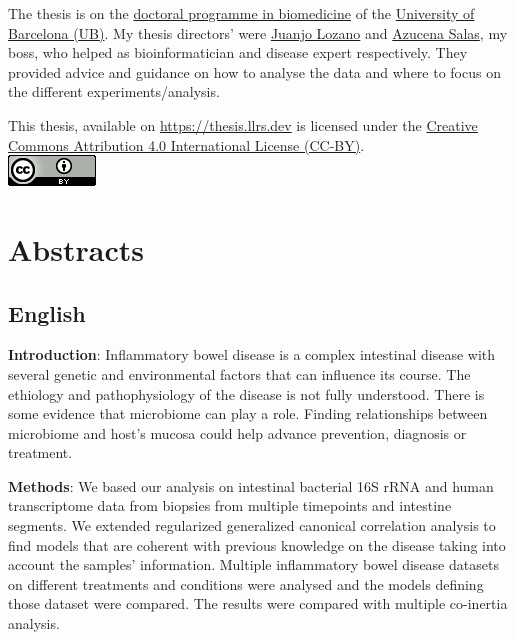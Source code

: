 \documentclass[
  12pt,
  a4paper,
  twoside,
  openright]{book}
\begin{document}
The thesis is on the \href{http://www.ub.edu/doctorat_biomedicina/eng/index.htm}{doctoral programme in biomedicine} of the \href{https://www.ub.edu/web/portal/en/}{University of Barcelona (UB)}.
My thesis directors' were \href{https://orcid.org/0000-0001-7613-3908}{Juanjo Lozano} and \href{https://orcid.org/0000-0003-4572-2907}{Azucena Salas}, my boss, who helped as bioinformatician and disease expert respectively.
They provided advice and guidance on how to analyse the data and where to focus on the different experiments/analysis.

This thesis, available on \url{https://thesis.llrs.dev} is licensed under the \href{https://creativecommons.org/licenses/by/4.0/}{Creative Commons Attribution 4.0 International License (CC-BY)}.\\
\includegraphics{images/by.png}

\hypertarget{abstracts}{%
\chapter*{Abstracts}\label{abstracts}}

\hypertarget{english}{%
\section*{English}\label{english}}

\textbf{Introduction}: Inflammatory bowel disease is a complex intestinal disease with several genetic and environmental factors that can influence its course.
The ethiology and pathophysiology of the disease is not fully understood.
There is some evidence that microbiome can play a role.
Finding relationships between microbiome and host's mucosa could help advance prevention, diagnosis or treatment.

\textbf{Methods}: We based our analysis on intestinal bacterial 16S rRNA and human transcriptome data from biopsies from multiple timepoints and intestine segments.
We extended regularized generalized canonical correlation analysis to find models that are coherent with previous knowledge on the disease taking into account the samples' information.
Multiple inflammatory bowel disease datasets on different treatments and conditions were analysed and the models defining those dataset were compared.
The results were compared with multiple co-inertia analysis.
\end{document}
